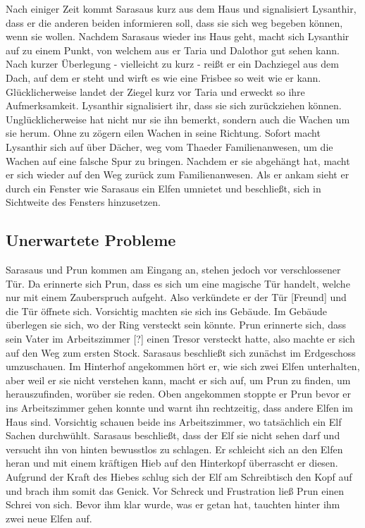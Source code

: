 \documentclass[10pt,twoside,twocolumn,openany]{book}
\begin{document}
	Nach einiger Zeit kommt Sarasaus kurz aus dem Haus und signalisiert Lysanthir, dass er die anderen beiden informieren soll, dass sie sich weg begeben können, wenn sie wollen. Nachdem Sarasaus wieder ins Haus geht, macht sich Lysanthir auf zu einem Punkt, von welchem aus er Taria und Dalothor gut sehen kann. Nach kurzer Überlegung - vielleicht zu kurz - reißt er ein Dachziegel aus dem Dach, auf dem er steht und wirft es wie eine Frisbee so weit wie er kann. Glücklicherweise landet der Ziegel kurz vor Taria und erweckt so ihre Aufmerksamkeit. Lysanthir signalisiert ihr, dass sie sich zurückziehen können. Unglücklicherweise hat nicht nur sie ihn bemerkt, sondern auch die Wachen um sie herum. Ohne zu zögern eilen Wachen in seine Richtung. Sofort macht Lysanthir sich auf über Dächer, weg vom Thaeder Familienanwesen, um die Wachen auf eine falsche Spur zu bringen. Nachdem er sie abgehängt hat, macht er sich wieder auf den Weg zurück zum Familienanwesen. Als er ankam sieht er durch ein Fenster wie Sarasaus ein Elfen  umnietet und beschließt, sich in Sichtweite des Fensters hinzusetzen.
	
	\subsection{Unerwartete Probleme}
	
	Sarasaus und Prun kommen am Eingang an, stehen jedoch vor verschlossener Tür. Da erinnerte sich Prun, dass es sich um eine magische Tür handelt, welche nur mit einem Zauberspruch aufgeht. Also verkündete er der Tür [Freund] und die Tür öffnete sich. Vorsichtig machten sie sich ins Gebäude. Im Gebäude überlegen sie sich, wo der Ring versteckt sein könnte. Prun erinnerte sich, dass sein Vater im Arbeitszimmer [?] einen Tresor versteckt hatte, also machte er sich auf den Weg zum ersten Stock. Sarasaus beschließt sich zunächst im Erdgeschoss umzuschauen. Im Hinterhof angekommen hört er, wie sich zwei Elfen unterhalten, aber weil er sie nicht verstehen kann, macht er sich auf, um Prun zu finden, um herauszufinden, worüber sie reden. Oben angekommen stoppte er Prun bevor er ins Arbeitszimmer gehen konnte und warnt ihn rechtzeitig, dass andere Elfen im Haus sind. Vorsichtig schauen beide ins Arbeitszimmer, wo tatsächlich ein Elf Sachen durchwühlt. Sarasaus beschließt, dass der Elf sie nicht sehen darf und versucht ihn von hinten bewusstlos zu schlagen. Er schleicht sich an den Elfen heran und mit einem kräftigen Hieb auf den Hinterkopf überrascht er diesen. Aufgrund der Kraft des Hiebes schlug sich der Elf am Schreibtisch den Kopf auf und brach ihm somit das Genick. Vor Schreck und Frustration ließ Prun einen Schrei von sich. Bevor ihm klar wurde, was er getan hat, tauchten hinter ihm zwei neue Elfen auf. 
	
\end{document}
